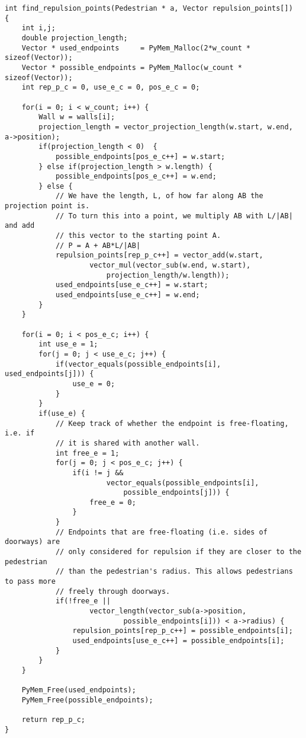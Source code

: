 \begin{lstlisting}[caption={Finding the wall repulsion 
    points.},label=lst:repulsion-points]
int find_repulsion_points(Pedestrian * a, Vector repulsion_points[])
{
    int i,j;
    double projection_length;
    Vector * used_endpoints     = PyMem_Malloc(2*w_count * sizeof(Vector));
    Vector * possible_endpoints = PyMem_Malloc(w_count * sizeof(Vector));
    int rep_p_c = 0, use_e_c = 0, pos_e_c = 0;

    for(i = 0; i < w_count; i++) {
        Wall w = walls[i];
        projection_length = vector_projection_length(w.start, w.end, a->position);
        if(projection_length < 0)  {
            possible_endpoints[pos_e_c++] = w.start;
        } else if(projection_length > w.length) {
            possible_endpoints[pos_e_c++] = w.end;
        } else {
            // We have the length, L, of how far along AB the projection point is.
            // To turn this into a point, we multiply AB with L/|AB| and add
            // this vector to the starting point A.
			// P = A + AB*L/|AB|
            repulsion_points[rep_p_c++] = vector_add(w.start, 
                    vector_mul(vector_sub(w.end, w.start), 
                        projection_length/w.length));
            used_endpoints[use_e_c++] = w.start;
            used_endpoints[use_e_c++] = w.end;
        }
    }

    for(i = 0; i < pos_e_c; i++) {
        int use_e = 1;
        for(j = 0; j < use_e_c; j++) {
            if(vector_equals(possible_endpoints[i], used_endpoints[j])) {
                use_e = 0;
            }
        }
        if(use_e) {
			// Keep track of whether the endpoint is free-floating, i.e. if
			// it is shared with another wall.
			int free_e = 1;
			for(j = 0; j < pos_e_c; j++) {
				if(i != j && 
						vector_equals(possible_endpoints[i],
							possible_endpoints[j])) {
					free_e = 0;
				}
			}
			// Endpoints that are free-floating (i.e. sides of doorways) are
			// only considered for repulsion if they are closer to the pedestrian
			// than the pedestrian's radius. This allows pedestrians to pass more
			// freely through doorways.
			if(!free_e || 
					vector_length(vector_sub(a->position,
							possible_endpoints[i])) < a->radius) {
				repulsion_points[rep_p_c++] = possible_endpoints[i];
				used_endpoints[use_e_c++] = possible_endpoints[i];
			}
        }
    }

    PyMem_Free(used_endpoints);
    PyMem_Free(possible_endpoints);

    return rep_p_c;
}
\end{lstlisting}

